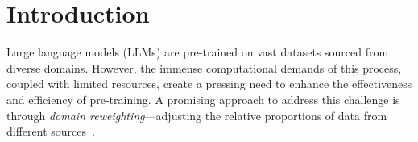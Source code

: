 \documentclass{article} %
\begin{document}
\begin{abstract}
\end{abstract}

\section{Introduction}
Large language models (LLMs) are pre-trained on vast datasets sourced from diverse domains. However, the immense computational demands of this process, coupled with limited resources, create a pressing need to enhance the effectiveness and efficiency of pre-training. A promising approach to address this challenge is through \textit{domain reweighting}---adjusting the relative proportions of data from different sources~\citep{xie2024doremi, chen2024skill, albalak2023efficient, soldaini2024dolma, fan2023doge, ye2024data}.
\end{document}
